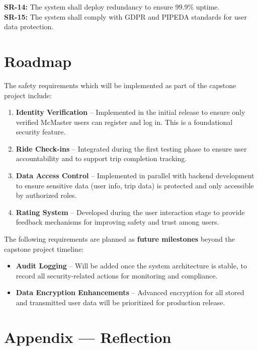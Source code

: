 \documentclass{article}
\begin{document}
\noindent \textbf{SR-14:} The system shall deploy redundancy to ensure 99.9\% uptime. \\

\noindent \textbf{SR-15:} The system shall comply with GDPR and PIPEDA standards for user data protection. \\

\section{Roadmap}

The safety requirements which will be implemented as part of the capstone project include:

\begin{enumerate}
    \item \textbf{Identity Verification} – Implemented in the initial release to ensure only verified McMaster users can register and log in. This is a foundational security feature.
    \item \textbf{Ride Check-ins} – Integrated during the first testing phase to ensure user accountability and to support trip completion tracking.
    \item \textbf{Data Access Control} – Implemented in parallel with backend development to ensure sensitive data (user info, trip data) is protected and only accessible by authorized roles.
    \item \textbf{Rating System} – Developed during the user interaction stage to provide feedback mechanisms for improving safety and trust among users.
\end{enumerate}

The following requirements are planned as \textbf{future milestones} beyond the capstone project timeline:

\begin{itemize}
    \item \textbf{Audit Logging} – Will be added once the system architecture is stable, to record all security-related actions for monitoring and compliance.
    \item \textbf{Data Encryption Enhancements} – Advanced encryption for all stored and transmitted user data will be prioritized for production release.
\end{itemize}

\newpage{}

\section*{Appendix --- Reflection}
\end{document}
